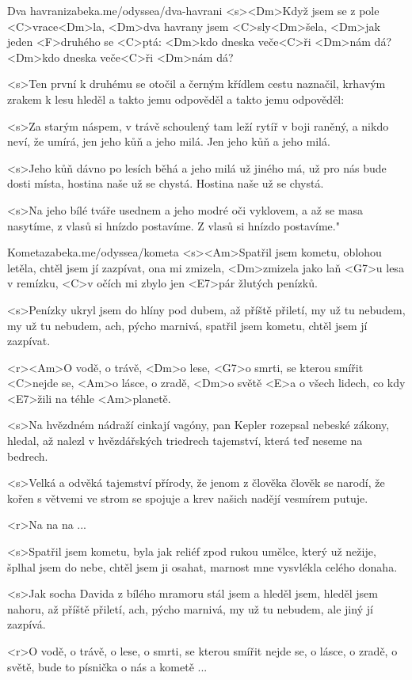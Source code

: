 \begin{song}[Asonance]{37}{Dva havrani}{zabeka.me/odyssea/dva-havrani}
	<s><Dm>Když jsem se z pole <C>vrace<Dm>la,
	<Dm>dva havrany jsem <C>sly<Dm>šela,
	<Dm>jak jeden <F>druhého se <C>ptá:
	<Dm>kdo dneska veče<C>ři <Dm>nám dá?
	<Dm>kdo dneska veče<C>ři <Dm>nám dá?

	<s>Ten první k druhému se otočil
	a černým křídlem cestu naznačil,
	krhavým zrakem k lesu hleděl
	a takto jemu odpověděl
	a takto jemu odpověděl:

	<s>Za starým náspem, v trávě schoulený
	tam leží rytíř v boji raněný,
	a nikdo neví, že umírá,
	jen jeho kůň a jeho milá.
	Jen jeho kůň a jeho milá.

	<s>Jeho kůň dávno po lesích běhá
	a jeho milá už jiného má,
	už pro nás bude dosti místa,
	hostina naše už se chystá.
	Hostina naše už se chystá.

	<s>Na jeho bílé tváře usednem
	a jeho modré oči vyklovem,
	a až se masa nasytíme,
	z vlasů si hnízdo postavíme.
	Z vlasů si hnízdo postavíme."

\end{song}
\begin{song}{40}{Kometa}{zabeka.me/odyssea/kometa}
	<s><Am>Spatřil jsem kometu, oblohou letěla,
	chtěl jsem jí zazpívat, ona mi zmizela,
	<Dm>zmizela jako laň <G7>u lesa v remízku,
	<C>v očích mi zbylo jen <E7>pár žlutých penízků.

	<s>Penízky ukryl jsem do hlíny pod dubem,
	až příště přiletí, my už tu nebudem,
	my už tu nebudem, ach, pýcho marnivá,
	spatřil jsem kometu, chtěl jsem jí zazpívat.

	<r><Am>O vodě, o trávě, <Dm>o lese,
	<G7>o smrti, se kterou smířit <C>nejde se,
	<Am>o lásce, o zradě, <Dm>o světě
	<E>a o všech lidech, co kdy <E7>žili na téhle <Am>planetě.

	<s>Na hvězdném nádraží cinkají vagóny,
	pan Kepler rozepsal nebeské zákony,
	hledal, až nalezl v hvězdářských triedrech
	tajemství, která teď neseme na bedrech.

	<s>Velká a odvěká tajemství přírody,
	že jenom z člověka člověk se narodí,
	že kořen s větvemi ve strom se spojuje
	a krev našich nadějí vesmírem putuje.

	<r>Na na na ...

	<s>Spatřil jsem kometu, byla jak reliéf
	zpod rukou umělce, který už nežije,
	šplhal jsem do nebe, chtěl jsem ji osahat,
	marnost mne vysvlékla celého donaha.

	<s>Jak socha Davida z bílého mramoru
	stál jsem a hleděl jsem, hleděl jsem nahoru,
	až příště přiletí, ach, pýcho marnivá,
	my už tu nebudem, ale jiný jí zazpívá.

	<r>O vodě, o trávě, o lese,
	o smrti, se kterou smířit nejde se,
	o lásce, o zradě, o světě,
	bude to písnička o nás a kometě ...
\end{song}
